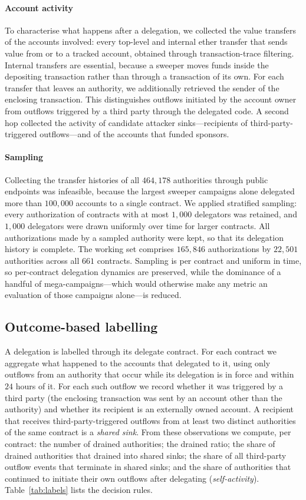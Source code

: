 \paragraph{Account activity} To characterise what happens after a delegation, we collected the value transfers of the accounts involved: every top-level and internal ether transfer that sends value from or to a tracked account, obtained through transaction-trace filtering. Internal transfers are essential, because a sweeper moves funds inside the depositing transaction rather than through a transaction of its own. For each transfer that leaves an authority, we additionally retrieved the sender of the enclosing transaction. This distinguishes outflows initiated by the account owner from outflows triggered by a third party through the delegated code. A second hop collected the activity of candidate attacker sinks---recipients of third-party-triggered outflows---and of the accounts that funded sponsors.

\paragraph{Sampling} Collecting the transfer histories of all $464{,}178$ authorities through public endpoints was infeasible, because the largest sweeper campaigns alone delegated more than $100{,}000$ accounts to a single contract. We applied stratified sampling: every authorization of contracts with at most $1{,}000$ delegators was retained, and $1{,}000$ delegators were drawn uniformly over time for larger contracts. All authorizations made by a sampled authority were kept, so that its delegation history is complete. The working set comprises $165{,}846$ authorizations by $22{,}501$ authorities across all $661$ contracts. Sampling is per contract and uniform in time, so per-contract delegation dynamics are preserved, while the dominance of a handful of mega-campaigns---which would otherwise make any metric an evaluation of those campaigns alone---is reduced.

\subsection{Outcome-based labelling}
A delegation is labelled through its delegate contract. For each contract we aggregate what happened to the accounts that delegated to it, using only outflows from an authority that occur while its delegation is in force and within $24$ hours of it. For each such outflow we record whether it was triggered by a third party (the enclosing transaction was sent by an account other than the authority) and whether its recipient is an externally owned account. A recipient that receives third-party-triggered outflows from at least two distinct authorities of the same contract is a \emph{shared sink}. From these observations we compute, per contract: the number of drained authorities; the drained ratio; the share of drained authorities that drained into shared sinks; the share of all third-party outflow events that terminate in shared sinks; and the share of authorities that continued to initiate their own outflows after delegating (\emph{self-activity}). Table~\ref{tab:labels} lists the decision rules.

